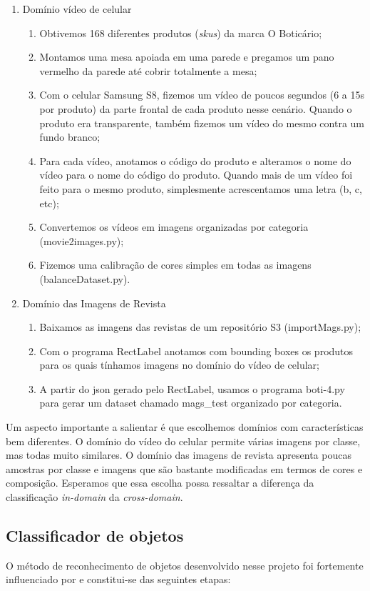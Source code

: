 \documentclass[conference]{IEEEtran}
\begin{document}
\begin{enumerate}
  \item Domínio vídeo de celular
    \begin{enumerate}
      \item Obtivemos 168 diferentes produtos (\textit{skus}) da marca O Boticário;
      \item Montamos uma mesa apoiada em uma parede e pregamos um pano vermelho da parede até cobrir totalmente a mesa;
      \item Com o celular Samsung S8, fizemos um vídeo de poucos segundos (6 a 15s por produto) da parte frontal de cada produto nesse cenário.  Quando o produto era transparente, também fizemos um vídeo do mesmo contra um fundo branco;
      \item Para cada vídeo, anotamos o código do produto e alteramos o nome do vídeo para o nome do código do produto.  Quando mais de um vídeo foi feito para o mesmo produto, simplesmente acrescentamos uma letra (b, c, etc);
      \item Convertemos os vídeos em imagens organizadas por categoria (movie2images.py);
      \item Fizemos uma calibração de cores simples em todas as imagens (balanceDataset.py).
    \end{enumerate}
  \item Domínio das Imagens de Revista
    \begin{enumerate}
      \item Baixamos as imagens das revistas de um repositório S3 (importMags.py);
      \item Com o programa RectLabel anotamos com bounding boxes os produtos para os quais tínhamos imagens no domínio do vídeo de celular;
      \item A partir do json gerado pelo RectLabel, usamos o programa boti-4.py para gerar um dataset chamado mags\_test organizado por categoria.
    \end{enumerate}
\end{enumerate}

Um aspecto importante a salientar é que escolhemos domínios com características bem diferentes. O domínio do vídeo do celular permite várias imagens por classe, mas todas muito similares. O domínio das imagens de revista apresenta poucas amostras por classe e imagens que são bastante modificadas em termos de cores e composição. Esperamos que essa escolha possa ressaltar a diferença da classificação \textit{in-domain} da \textit{cross-domain}.
 \subsection{Classificador de objetos}
O método de reconhecimento de objetos desenvolvido nesse projeto foi fortemente influenciado por \cite{fastai} e constitui-se das seguintes etapas:
\end{document}
